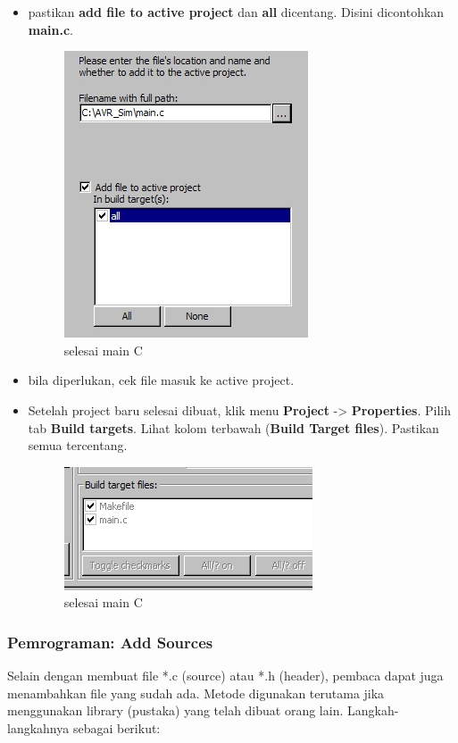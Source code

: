 \documentclass[12pt,]{article}
\begin{document}
\begin{itemize}
		\item pastikan \textbf{add file to active project} dan \textbf{all} dicentang.
		Disini dicontohkan \textbf{main.c}.
		\begin{figure}[H]
			\centering
			\includegraphics[width=0.5\linewidth]{images/hello_a13}
			\caption{selesai main C}
		\end{figure}

		\item bila diperlukan, cek file masuk ke active project.
		\item Setelah project baru selesai dibuat, klik menu \textbf{Project} -> \textbf{Properties}.
		Pilih tab \textbf{Build targets}.
		Lihat kolom terbawah (\textbf{Build Target files}).
		Pastikan semua tercentang.
		\begin{figure}[H]
			\centering
			\includegraphics[width=0.5\linewidth]{images/hello_a14}
			\caption{selesai main C}
		\end{figure}

	\end{itemize}

	\newpage
	\subsubsection{Pemrograman: Add Sources}

	Selain dengan membuat file *.c (source) atau *.h (header), pembaca dapat juga menambahkan file yang sudah ada.
	Metode digunakan terutama jika menggunakan library (pustaka) yang telah dibuat orang lain.
	Langkah-langkahnya sebagai berikut:
\end{document}
